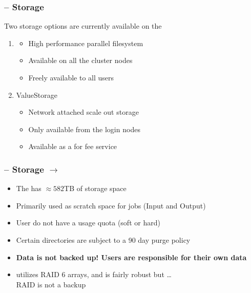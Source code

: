 \begin{frame}
	\frametitle{{\craycs} -- Storage}
	Two storage options are currently available on the {\craycs}
	\begin{enumerate}
		\item {\lustre}
                  \begin{itemize}
                  \item High performance parallel filesystem 
                  \item Available on all the cluster nodes
                    \item Freely available to all users
                  \end{itemize}
		\item ValueStorage
                  \begin{itemize}
                  \item Network attached scale out storage
                  \item Only available from the login nodes
                  \item Available as a for fee service
                  \end{itemize}
	\end{enumerate}
\end{frame}


\begin{frame}
	\frametitle{{\craycs} -- Storage $\rightarrow$ {\lustre}}
	\begin{itemize}
		\item The {\craycs} has $\approx582$TB of storage space

		\item Primarily used as scratch space for jobs (Input and Output)
		\item User do not have a usage quota (soft or hard)
		\item Certain directories are subject to a 90 day purge policy
		\item \textbf{Data is not backed up!  Users are responsible for their own data}
                \item {\lustre} utilizes RAID 6 arrays, and is fairly robust but \ldots~\\RAID is not a backup
	\end{itemize}
\end{frame}


